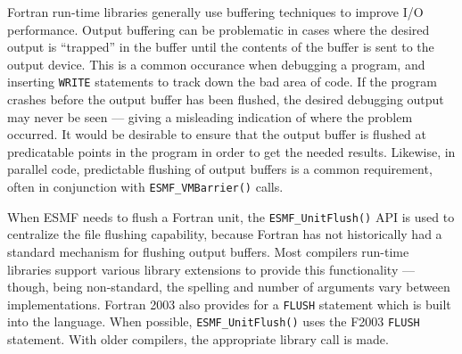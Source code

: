 Fortran run-time libraries generally use buffering techniques to improve I/O
performance.  Output buffering can be problematic in cases where the desired
output is ``trapped'' in the buffer until the contents of the buffer is sent
to the output device.  This is a
common occurance when debugging a program, and inserting {\tt WRITE} statements
to track down the bad area of code.  If the program crashes before the output
buffer has been flushed, the desired debugging output may never be seen --- giving
a misleading indication of where the problem occurred.  It would be desirable
to ensure that the output buffer is flushed at predicatable
points in the program in order to get the needed results.
Likewise, in parallel code, predictable flushing of output buffers is a common
requirement, often in conjunction with {\tt ESMF\_VMBarrier()} calls.  

When ESMF needs to flush a Fortran unit, the {\tt ESMF\_UnitFlush()} API is used
to centralize the file flushing capability, because Fortran has not historically
had a standard mechanism for flushing output buffers.  Most compilers run-time libraries
support various library extensions to provide this functionality --- though,
being non-standard, the spelling and number of arguments vary between implementations.
Fortran 2003 also provides for a {\tt FLUSH} statement which is built into the
language.  When possible, {\tt ESMF\_UnitFlush()} uses the F2003 {\tt FLUSH} statement.
With older compilers, the appropriate library call is made.
